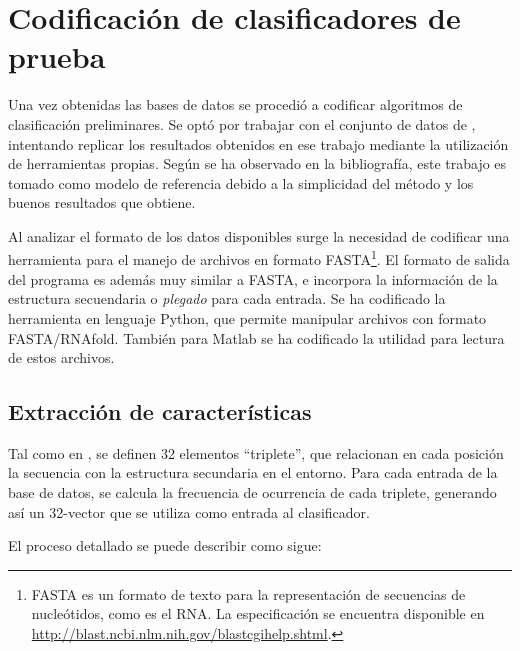 \section{Codificación de clasificadores de prueba}
\label{pruebas}

Una vez obtenidas las bases de datos se procedió a codificar
algoritmos de clasificación preliminares.
Se optó por trabajar con el conjunto de datos de \cite{xue},
intentando replicar los resultados obtenidos en ese trabajo mediante
la utilización de herramientas propias. Según se ha observado en la
bibliografía, este trabajo es tomado como modelo de referencia debido a
la simplicidad del método y los buenos resultados que obtiene.

Al analizar el formato de los datos disponibles surge la necesidad
de codificar una herramienta para el manejo de archivos en formato
FASTA\footnote{FASTA es un formato de texto para la representación
  de secuencias de nucleótidos, como es el RNA.
  La especificación se encuentra disponible en
  \url{http://blast.ncbi.nlm.nih.gov/blastcgihelp.shtml}.}.
El formato de salida del programa  es además
muy similar a FASTA, e incorpora la información de la estructura
secuendaria o \emph{plegado} para cada entrada.
Se ha codificado la herramienta  en lenguaje Python,
que permite manipular archivos con formato FASTA/RNAfold. También para
Matlab se ha codificado la utilidad  para lectura
de estos archivos.

\subsection{Extracción de características}
Tal como en \cite{xue}, se definen 32 elementos ``triplete'', que
relacionan en cada posición la secuencia con la estructura secundaria
en el entorno. Para cada entrada de la base de datos, se calcula la
frecuencia de ocurrencia de cada triplete, generando así un 32-vector
que se utiliza como entrada al clasificador.

El proceso detallado se puede describir como sigue:


